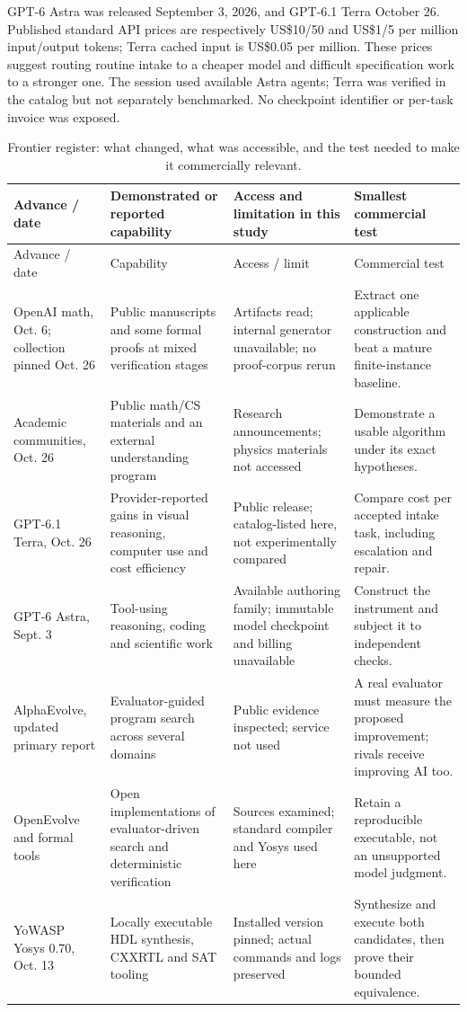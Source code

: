 GPT-6 Astra was released September 3, 2026, and GPT-6.1 Terra October 26. Published standard API prices are respectively US\$10/50 and US\$1/5 per million input/output tokens; Terra cached input is US\$0.05 per million. These prices suggest routing routine intake to a cheaper model and difficult specification work to a stronger one. The session used available Astra agents; Terra was verified in the catalog but not separately benchmarked. No checkpoint identifier or per-task invoice was exposed.\cite{astra,terra,changelog}

\begin{longtable}{L{0.18\textwidth}L{0.22\textwidth}L{0.25\textwidth}L{0.26\textwidth}}
\caption{Frontier register: what changed, what was accessible, and the test needed to make it commercially relevant.}\label{tab:frontier}\\
\toprule Advance / date & Demonstrated or reported capability & Access and limitation in this study & Smallest commercial test \\
\midrule\endfirsthead
\toprule Advance / date & Capability & Access / limit & Commercial test \\
\midrule\endhead
OpenAI math, Oct. 6; collection pinned Oct. 26 & Public manuscripts and some formal proofs at mixed verification stages & Artifacts read; internal generator unavailable; no proof-corpus rerun & Extract one applicable construction and beat a mature finite-instance baseline.\\
Academic communities, Oct. 26 & Public math/CS materials and an external understanding program & Research announcements; physics materials not accessed & Demonstrate a usable algorithm under its exact hypotheses.\\
GPT-6.1 Terra, Oct. 26 & Provider-reported gains in visual reasoning, computer use and cost efficiency & Public release; catalog-listed here, not experimentally compared & Compare cost per accepted intake task, including escalation and repair.\\
GPT-6 Astra, Sept. 3 & Tool-using reasoning, coding and scientific work & Available authoring family; immutable model checkpoint and billing unavailable & Construct the instrument and subject it to independent checks.\\
AlphaEvolve, updated primary report & Evaluator-guided program search across several domains & Public evidence inspected; service not used & A real evaluator must measure the proposed improvement; rivals receive improving AI too.\\
OpenEvolve and formal tools & Open implementations of evaluator-driven search and deterministic verification & Sources examined; standard compiler and Yosys used here & Retain a reproducible executable, not an unsupported model judgment.\\
YoWASP Yosys 0.70, Oct. 13 & Locally executable HDL synthesis, CXXRTL and SAT tooling & Installed version pinned; actual commands and logs preserved & Synthesize and execute both candidates, then prove their bounded equivalence.\\
\bottomrule
\end{longtable}

